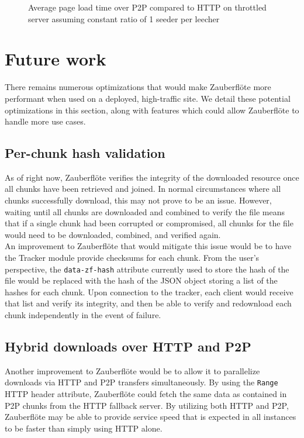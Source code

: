 \documentclass[letterpaper,twocolumn,10pt]{article}
\newcommand{\zbf}{Zauberfl\"{o}te\xspace}
\begin{document}
\begin{figure}[h]
\caption{Average page load time over P2P compared to HTTP on throttled server assuming constant ratio of 1 seeder per leecher}
\end{figure}


\section{Future work}

There remains numerous optimizations that would make \zbf more performant
when used on a deployed, high-traffic site. We detail these potential optimizations
in this section, along with features which could allow \zbf to handle more use cases.

\subsection{Per-chunk hash validation}
As of right now, \zbf verifies the integrity of the downloaded resource once all
chunks have been retrieved and joined. In normal circumstances where all chunks
successfully download, this may not prove to be an issue. However, waiting until
all chunks are downloaded and combined to verify the file means that if a single
chunk had been corrupted or compromised, all chunks for the file would need to be
downloaded, combined, and verified again. \\

An improvement to \zbf that would mitigate this issue would be to have the Tracker
module provide checksums for each chunk. From the user's perspective, the
\texttt{data-zf-hash} attribute currently used to store the hash of the file
would be replaced with the hash of the JSON object storing a list of the hashes
for each chunk. Upon connection to the tracker, each client would receive that
list and verify its integrity, and then be able to verify and redownload each chunk
independently in the event of failure.

\subsection{Hybrid downloads over HTTP and P2P}

Another improvement to \zbf would be to allow it to parallelize downloads via HTTP and P2P transfers simultaneously. By using the \texttt{Range} HTTP header attribute, \zbf could fetch the same data as contained in P2P chunks from the HTTP fallback server. By utilizing both HTTP and P2P, \zbf may be able to provide service speed that is expected in all instances to be faster than simply using HTTP alone.
\end{document}
